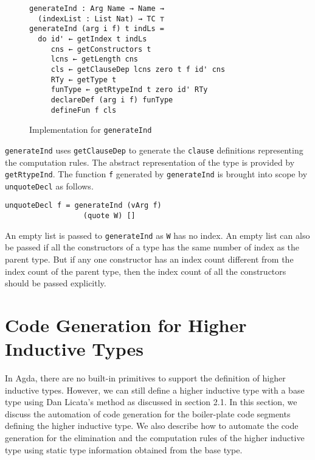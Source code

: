 \documentclass[sigplan,10pt]{acmart}
\begin{document}

\begin{figure}
\begin{center}
\begingroup
\fontsize{7pt}{9pt}\selectfont
\begin{Verbatim}
generateInd : Arg Name → Name → 
  (indexList : List Nat) → TC ⊤
generateInd (arg i f) t indLs =
  do id' ← getIndex t indLs
     cns ← getConstructors t
     lcns ← getLength cns
     cls ← getClauseDep lcns zero t f id' cns
     RTy ← getType t
     funType ← getRtypeInd t zero id' RTy
     declareDef (arg i f) funType
     defineFun f cls
\end{Verbatim}
\endgroup
\end{center}
\caption{Implementation for {\tt generateInd}}
\label{fig:generateInd}
\end{figure}
\normalsize


{\tt generateInd} uses {\tt getClauseDep} to generate the {\tt clause} definitions representing the computation rules. The abstract representation of the type is provided by {\tt getRtypeInd}. The function {\tt f} generated by {\tt generateInd} is brought into scope by {\tt unquoteDecl} as follows.
\begin{center}
\begingroup
\begin{BVerbatim}
unquoteDecl f = generateInd (vArg f) 
                  (quote W) []
\end{BVerbatim}
\endgroup
\end{center}

An empty list is passed to {\tt generateInd} as {\tt W} has no index. An empty list can also be passed if all the constructors of a type has the same number of index as the parent type. But if any one constructor has an index count different from the index count of the parent type, then the index count of all the constructors should be passed explicitly.

\section{Code Generation for Higher Inductive Types}
\label{sec:sec4}

In Agda, there are no built-in primitives to support the definition of higher inductive types. However, we can still define a higher inductive type with a base type using Dan Licata's \citep{Licata-2011} method as discussed in section 2.1. In this section, we discuss the automation of code generation for the boiler-plate code segments defining the higher inductive type. We also describe how to automate the code generation for the elimination and the computation rules of the higher inductive type using static type information obtained from the base type.
\end{document}
